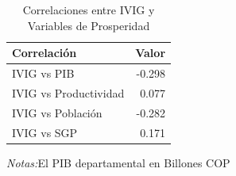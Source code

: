 \documentclass[12pt]{article}
\begin{document}
\setcounter{table}{5}
\begin{table}[htbp]
\centering
\begin{threeparttable}

\caption{Correlaciones entre IVIG y Variables de Prosperidad}
\begin{tabular}[t]{lr}
\toprule
Correlación & Valor\\
\midrule
IVIG vs PIB & -0.298\\
IVIG vs Productividad & 0.077\\
IVIG vs Población & -0.282\\
IVIG vs SGP & 0.171\\
\bottomrule
\end{tabular}
\begin{tablenotes}
\footnotesize
\item \textit{Notas:}El PIB departamental en Billones COP
\end{tablenotes}
\end{threeparttable}
\end{table}
\end{document}
